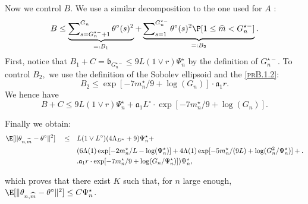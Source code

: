 Now we control $B$.
We use a similar decomposition to the one used for $A$ :
\[ B \leq \underbrace{\sum\nolimits_{s = G_{n}^{\star-} + 1}^{G_{n}} \theta^{\circ}(s)^{2}}_{=: B_{1}} + \underbrace{\sum\nolimits_{s = 1}^{G_{n}^{\star-}} \theta^{\circ}(s)^{2} \P[1 \leq \widehat{m} < G_{n}^{\star-}]}_{=: B_{2}}.\]
First, notice that $B_{1} + C = \mathfrak{b}_{G_{n}^{\star-}} \leq 9 L (1 \vee r) \Psi_{n}^{\star}$ by the definition of $G_{n}^{\star-}$.
To control $B_{2},$ we use the definition of the Sobolev ellipsoid and the \textsc{\cref{prB.1.2}}:
\[ B_{2} \leq \exp[-7 m_{n}^{\star}/9 + \log(G_{n})] \cdot \mathfrak{a}_{1}r.\]
We hence have
\[B + C \leq 9 L (1 \vee r ) \Psi_{n}^{\star} + \mathfrak{a}_{1} L^{\circ} \cdot \exp[-7 m_{n}^{\star}/9 + \log(G_{n})].\]

Finally we obtain:
\begin{alignat*}{3}
& \E[\Vert \theta_{n, \widehat{m}} - \theta^{\circ} \Vert^{2}] && \leq && L ( 1 \vee L^{\circ} ) ( 4 \Lambda_{D^{\star}} + 9) \Psi_{n}^{\star} +\\
& && && (6 \Lambda(1) \exp[- 2 m_{n}^{\star}/L - \log(\Psi_{n}^{\star})] + 4 \Lambda(1) \exp[-5 m_{n}^{\star}/(9 L) + \log (G_{n}^{2}/\Psi_{n}^{\star})] + .\\
& && && .\mathfrak{a}_{1} r \cdot \exp[-7 m_{n}^{\star}/9 + \log(G_{n}/\Psi_{n}^{\star})]) \Psi_{n}^{\star},\\
\end{alignat*}

which proves that there exist $K$ such that, for $n$ large enough, $\E[\Vert \theta_{n, \widehat{m}} - \theta^{\circ} \Vert^{2}] \leq C \Psi_{n}^{\star}$.
\proEnd